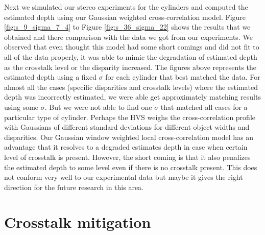Next we simulated our stereo experiments for the cylinders and computed the estimated depth using our Gaussian weighted cross-correlation model. Figure \ref{fig:s_9_sigma_7_4} to Figure \ref{fig:s_36_sigma_22} shows the results that we obtained and there comparison with the data we got from our experiments. We observed that even thought this model had some short comings and did not fit to all of the data properly, it was able to mimic the degradation of estimated depth as the crosstalk level or the disparity increased. The figures above represents the estimated depth using a fixed $\sigma$ for each cylinder that best matched the data. For almost all the cases (specific disparities and crosstalk levels) where the estimated depth was incorrectly estimated, we were able get approximately matching results using some $\sigma$. But we were not able to find one $\sigma$ that matched all cases for a particular type of cylinder. Perhaps the HVS weighs the cross-correlation profile with Gaussians of different standard deviations for different object widths and disparities. Our Gaussian window weighted local cross-correlation model has an advantage that it resolves to a degraded estimates depth in case when certain level of crosstalk is present. However, the short coming is that it also penalizes the estimated depth to some level even if there is no crosstalk present. This does not conform very well to our experimental data but maybe it gives the right direction for the future research in this area.
\pagebreak

\section{Crosstalk mitigation}

